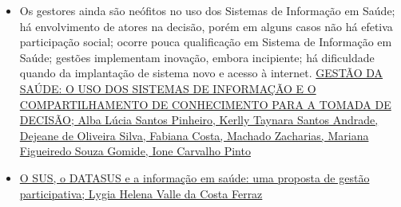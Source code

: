 \documentclass[]{book}
\begin{document}
\begin{itemize}
\item
  Os gestores ainda são neófitos no uso dos Sistemas de Informação em Saúde; há envolvimento de atores na decisão, porém em alguns casos não há efetiva participação social; ocorre pouca qualificação em Sistema de Informação em Saúde; gestões implementam inovação, embora incipiente; há dificuldade quando da implantação de sistema novo e acesso à internet. \href{http://www.scielo.br/pdf/tce/v25n3/pt_0104-0707-tce-25-03-3440015.pdf}{GESTÃO DA SAÚDE: O USO DOS SISTEMAS DE INFORMAÇÃO E O COMPARTILHAMENTO DE CONHECIMENTO PARA A TOMADA DE DECISÃO; Alba Lúcia Santos Pinheiro, Kerlly Taynara Santos Andrade, Dejeane de Oliveira Silva, Fabiana Costa, Machado Zacharias, Mariana Figueiredo Souza Gomide, Ione Carvalho Pinto}
\item
  \href{https://bvssp.icict.fiocruz.br/pdf/25885_ferrazlhvcm.pdf}{O SUS, o DATASUS e a informação em saúde: uma proposta de gestão participativa; Lygia Helena Valle da Costa Ferraz}
\end{itemize}


\end{document}
